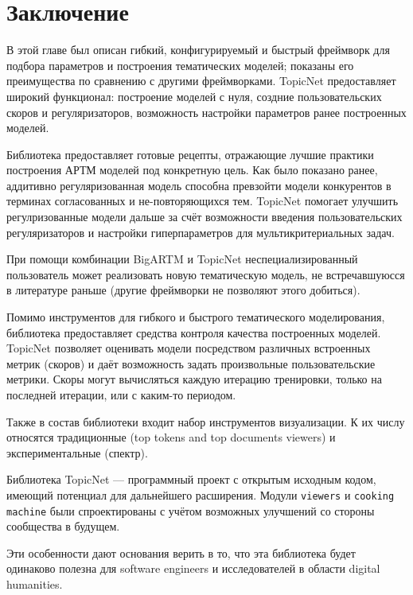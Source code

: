 




\section{Заключение}
В этой главе был описан гибкий, конфигурируемый и быстрый фреймворк для подбора параметров и построения тематических моделей; показаны его преимущества по сравнению с другими фреймворками. TopicNet предоставляет широкий функционал: построение моделей с нуля, создние пользовательских скоров и регуляризаторов, возможность настройки параметров ранее построенных моделей.

Библиотека предоставляет готовые рецепты, отражающие лучшие практики построения АРТМ моделей под конкретную цель. Как было показано ранее, аддитивно регуляризованная модель способна превзойти модели конкурентов в терминах согласованных и не-повторяющихся тем. TopicNet помогает улучшить регулризованные модели дальше за счёт возможности введения пользовательских регуляризаторов и настройки гиперпараметров для мультикритериальных задач. 

При помощи комбинации BigARTM и TopicNet неспециализированный пользователь может реализовать новую тематическую модель, не встречавшуюсся в литературе раньше (другие фреймворки не позволяют этого добиться).

Помимо инструментов для гибкого и быстрого тематического моделирования, библиотека предоставляет средства контроля качества построенных моделей. TopicNet позволяет оценивать модели посредством различных встроенных метрик (скоров) и даёт возможность задать произвольные пользовательские метрики. Скоры могут вычисляться каждую итерацию тренировки, только на последней итерации, или с каким-то периодом. 

Также в состав библиотеки входит набор инструментов визуализации. К их числу относятся традиционные (top tokens and top documents viewers) и экспериментальные (спектр).

Библиотека TopicNet --- программный проект с открытым исходным кодом, имеющий потенциал для дальнейшего расширения. Модули \texttt{viewers} и \texttt{cooking machine} были спроектированы с учётом возможных улучшений со стороны сообщества в будущем.

Эти особенности дают основания верить в то, что эта библиотека будет одинаково полезна для software engineers и исследователей в области digital humanities.


